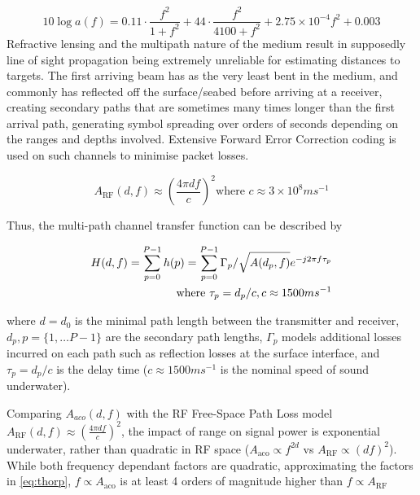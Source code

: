 \begin{equation}
\label{eq:thorp}
10 \log a(f) = 0.11 \cdot \frac{f^2}{1+f^2} + 44\cdot\frac{f^2}{4100+f^2}+ 2.75\times10^{-4} f^2 + 0.003
\end{equation}
%
Refractive lensing and the multipath nature of the medium result in supposedly line of sight propagation being extremely unreliable for estimating distances to targets.
The first arriving beam has as the very least bent in the medium, and commonly has reflected off the surface/seabed before arriving at a receiver, creating secondary paths that are sometimes many times longer than the first arrival path, generating symbol spreading over orders of seconds depending on the ranges and depths involved.
Extensive Forward Error Correction coding is used on such channels to minimise packet losses.

\begin{equation}
\label{eq:fspl}
A_{\text{RF}}(d,f) \approx \left( \frac{4\pi d f}{c} \right)^2
\text{where }c\approx 3\times10^8ms^{-1}
\end{equation}


Thus, the multi-path channel transfer function can be described by 

\begin{align}
\label{eq:acomultipath}
H(d,f) =\sum_{p=0}^{P-1} h(p) = \sum_{p=0}^{P-1} \Gamma_p / \sqrt{A(d_p,f)}e^{-j 2 \pi f \tau_p} \\
\text{where } \tau_p = d_p/c, c \approx 1500 ms^{-1} \notag
\end{align}

where $d=d_0$ is the minimal path length between the transmitter and receiver, $d_p,p=\{1,\dots P-1\}$ are the secondary path lengths, $\Gamma_p$ models additional losses incurred on each path such as reflection losses at the surface interface, and $\tau_p = d_p/c$ is the delay time ($c \approx 1500 ms^{-1}$ is the nominal speed of sound underwater).


Comparing $A_{aco}(d,f)$ with the RF Free-Space Path Loss model $A_{\text{RF}}(d,f) \approx \left( \frac{4\pi d f}{c} \right)^2$, the impact of range on signal power is exponential underwater, rather than quadratic in RF space ($A_{\text{aco}} \propto f^{2d}$ vs $A_{\text{RF}} \propto (df)^2$). 
While both frequency dependant factors are quadratic, approximating the factors in \eqref{eq:thorp}, $f\propto A_{\text{aco}}$ is at least 4 orders of magnitude higher than $f\propto A_{\text{RF}}$


